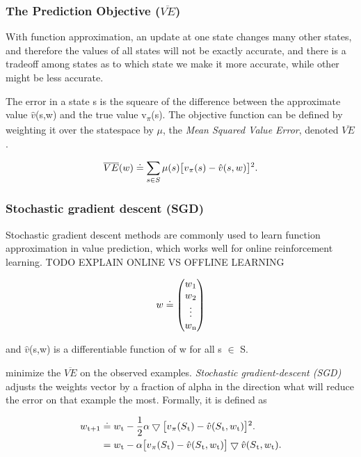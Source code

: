 \documentclass[12pt,twoside]{report}
\theoremstyle{plain}
\theoremstyle{definition}
\begin{document}
\subsubsection{The Prediction Objective ($\overline{VE}$)}
With function approximation, an update at one state changes many other states, and therefore the values of all states will not be exactly accurate, and there is a tradeoff among states as to which state we make it more accurate, while other might be  less accurate. 

The error in a state s is the squeare of the difference between the approximate value $\hat{v}$(s,w) and the true value v\textsubscript{$\pi$}(s). The objective function can be defined by weighting it over the statespace by $\mu$, the \textit{Mean Squared Value Error}, denoted $\overline{VE}$.

\begin{equation}
\overline{VE}(w) \doteq \sum_{s \in S} \mu (s) \big[ v\textsubscript{$\pi$}(s) - \hat{v}(s,w) \big]\textsuperscript{2}.
\end{equation}
\label{ve}

\subsubsection{Stochastic gradient descent (SGD)}
Stochastic gradient descent methods are commonly used to learn function approximation in value prediction, which works well for online reinforcement learning.
TODO EXPLAIN ONLINE VS OFFLINE LEARNING

\begin{equation}
 w \doteq  \begin{pmatrix}  w\textsubscript{1}  \\ w\textsubscript{2} \\ \vdots \\ w\textsubscript{n}   \end{pmatrix}
\end{equation}

and $\hat{v}$(s,w) is a differentiable function of w for all s $\in$ S. 

minimize the $\overline{VE}$ on the observed examples. \textit{Stochastic gradient-descent (SGD) } adjusts the weights vector by a fraction of alpha in the direction what will reduce the error on that example the most. Formally, it is defined as 

\begin{equation}
\begin{split}
w\textsubscript{t+1} & \doteq w\textsubscript{t} -  \frac{1}{2} \alpha  \bigtriangledown \big[ v\textsubscript{$\pi$}(S\textsubscript{t}) - \hat{v}(S\textsubscript{t}, w\textsubscript{t}) \big]\textsuperscript{2}. \\
& = w\textsubscript{t} -  \alpha  \big[ v\textsubscript{$\pi$}(S\textsubscript{t}) - \hat{v}(S\textsubscript{t}, w\textsubscript{t}) \big] \bigtriangledown \hat{v}(S\textsubscript{t}, w\textsubscript{t}).
\end{split}
\end{equation}
\end{document}
